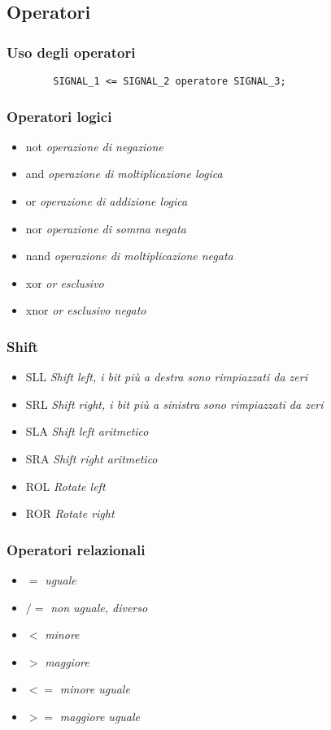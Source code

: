 \documentclass{article}
\begin{document}
\subsection{Operatori}
\subsubsection{Uso degli operatori}
\begin{verbatim}
	    SIGNAL_1 <= SIGNAL_2 operatore SIGNAL_3;
\end{verbatim}

\subsubsection{Operatori logici}
\begin{itemize}
	\item not \textit{operazione di negazione}
	\item and \textit{operazione di moltiplicazione logica}
	\item or \textit{operazione di addizione logica}
	\item nor \textit{operazione di somma negata}
	\item nand \textit{operazione di moltiplicazione negata}
	\item xor \textit{or esclusivo}
	\item xnor \textit{or esclusivo negato}
\end{itemize}

\subsubsection{Shift}
\begin{itemize}
	\item SLL \textit{Shift left, i bit più a destra sono rimpiazzati da zeri}
	\item SRL \textit{Shift right, i bit più a sinistra sono rimpiazzati da zeri}
	\item SLA \textit{Shift left aritmetico}
	\item SRA \textit{Shift right aritmetico}
	\item ROL \textit{Rotate left}
	\item ROR \textit{Rotate right}
\end{itemize}
\subsubsection{Operatori relazionali}
\begin{itemize}
	\item \(=\) \textit{uguale}
	\item \(/=\) \textit{non uguale, diverso}
	\item \(<\) \textit{minore}
	\item \(>\) \textit{maggiore}
	\item \(<=\) \textit{minore uguale}
	\item \(>=\) \textit{maggiore uguale}
\end{itemize}
\end{document}
